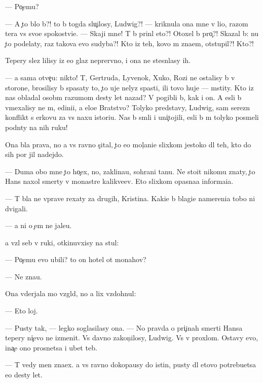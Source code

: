 \documentclass[10pt]{book}
\begin{document}
— Po{\c}emu?

— A {\c}to b{\yi}lo b{\yi}?! {\C}to b{\yi} togda slu{\c}ilosy, Ludwig?! — kriknula ona mne v li{\q}o, razom ter{\ia}{\y}a vs{\e} svo{\y}e spoko{\y}stvi{\y}e. — Skaji mne! T{\yi} b{\yi} prin{\ia}l eto?! Otoxel b{\yi} pro{\c}?! Skazal b{\yi}: nu {\c}to podelaty, raz takova {\y}evo sudyba?! Kto iz teh, kovo m{\yi} zna{\y}em, otstupil?! Kto?!

Tepery slez{\yi} lilisy iz {\y}e{\y}o glaz neprer{\yi}vno, i ona ne stesn{\ia}lasy ih.

— {\Y}a sama otve{\c}u: nikto! T{\yi}, Gertruda, Lyvenok, Xuko, Rozi ne ostalisy b{\yi} v storone, brosilisy b{\yi} spasaty to, {\c}to uje nelyz{\ia} spasti, ili tovo huje — mstity. Kto iz nas obladal osob{\yi}m razumom des{\ia}ty let nazad? V{\yi} pogibli b{\yi}, kak i on. A {\y}esli b{\yi} vmexalisy ne m{\yi}, {\y}edini{\q}i, a {\q}elo{\y}e Bratstvo? Tolyko predstavy, Ludwig, sam{\yi}{\y} ser{\y}ezn{\yi}{\y} konflikt s {\Q}erkov{\y}u za vs{\iu} naxu istori{\y}u. Nas b{\yi} sm{\ia}li i uni{\c}tojili, {\y}esli b{\yi} m{\yi} tolyko posmeli podn{\ia}ty na nih ruku!

Ona b{\yi}la prava, no {\y}a vs{\e} ravno s{\c}ital, {\c}to {\y}e{\y}o mol{\c}ani{\y}e slixkom jestoko dl{\ia} teh, kto do sih por jil nadejdo{\y}.

— Duma{\y} obo mne {\c}to ho{\c}ex, no, zaklina{\y}u, sohrani ta{\y}nu. Ne sto{\y}it nikomu znaty, {\c}to Hans naxol smerty v monast{\yi}re kalikve{\q}ev. Eto slixkom opasna{\y}a informa{\q}i{\y}a.

— T{\yi} b{\yi}la ne vprave rexaty za drugih, Kristina. Kaki{\y}e b{\yi} blagi{\y}e namereni{\y}a tobo{\y} ni dvigali.

— {\Y}a ni o {\c}em ne jale{\y}u.

{\Y}a vz{\ia}l seb{\ia} v ruki, otkinuvxisy na stul:

— Po{\c}emu {\y}evo ubili? {\C}to on hotel ot monahov?

— Ne zna{\y}u.

Ona v{\yi}derjala mo{\y} vzgl{\ia}d, no {\y}a lix vzdohnul:

— Eto loj.

— Pusty tak, — legko soglasilasy ona. — No pravda o pri{\c}inah smerti Hansa tepery ni{\c}evo ne izmenit. Vs{\e} davno zakon{\c}ilosy, Ludwig. Vs{\e} v proxlom. Ostavy {\y}evo, ina{\c}e ono prosnetsa i ub{\y}et teb{\ia}.

— T{\yi} vedy men{\ia} zna{\y}ex. {\Y}a vs{\e} ravno dokopa{\y}usy do istin{\yi}, pusty dl{\ia} etovo potrebu{\y}etsa {\y}e{\x}o des{\ia}ty let.
\end{document}
